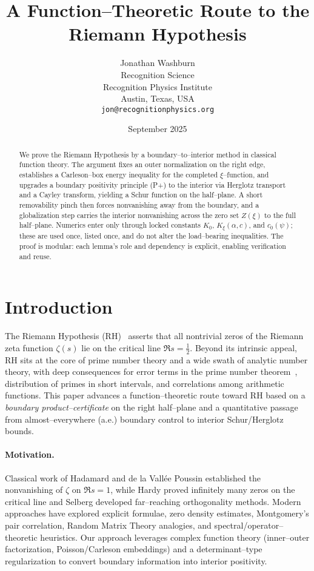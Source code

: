 \documentclass[11pt]{article}
\title{A Function--Theoretic Route to the Riemann Hypothesis}
\author{Jonathan Washburn\\
Recognition Science\\
Recognition Physics Institute\\
Austin, Texas, USA\\
\texttt{jon@recognitionphysics.org}}
\date{September 2025}
\theoremstyle{definition}
\theoremstyle{remark}
\begin{document}
\begin{abstract}
We prove the Riemann Hypothesis by a boundary--to--interior method in classical function theory. The argument fixes an outer normalization on the right edge, establishes a Carleson--box energy inequality for the completed $\xi$--function, and upgrades a boundary positivity principle (P+) to the interior via Herglotz transport and a Cayley transform, yielding a Schur function on the half--plane. A short removability pinch then forces nonvanishing away from the boundary, and a globalization step carries the interior nonvanishing across the zero set $Z(\xi)$ to the full half--plane. Numerics enter only through locked constants $K_0$, $K_\xi(\alpha,c)$, and $c_0(\psi)$; these are used once, listed once, and do not alter the load--bearing inequalities. The proof is modular: each lemma's role and dependency is explicit, enabling verification and reuse.
\end{abstract}
\maketitle
\section{Introduction}
The Riemann Hypothesis (RH)~\cite{Titchmarsh,Ivic} asserts that all nontrivial zeros of the Riemann zeta function $\zeta(s)$
lie on the critical line $\Re s=\tfrac12$. Beyond its intrinsic appeal, RH sits at the core of prime number theory and a wide swath
of analytic number theory, with deep consequences for error terms in the prime number theorem~\cite{DavenportMNT,MontgomeryVaughan},
distribution of primes in short intervals, and correlations among arithmetic functions.
This paper advances a function--theoretic route toward RH based on a \emph{boundary product--certificate} on the
right half--plane
and a quantitative passage from almost--everywhere (a.e.) boundary control to interior Schur/Herglotz bounds.

\paragraph{Motivation.}
Classical work of Hadamard and de la Vallée Poussin established the nonvanishing of $\zeta$ on $\Re s=1$,
while Hardy proved infinitely many zeros on the critical line and Selberg developed far--reaching orthogonality methods.
Modern approaches have explored explicit formulae, zero density estimates, Montgomery's pair correlation,
Random Matrix Theory analogies, and spectral/operator--theoretic heuristics.
Our approach leverages complex function theory (inner--outer factorization, Poisson/Carleson embeddings)
and a determinant--type regularization to convert boundary information into interior positivity.
\end{document}
